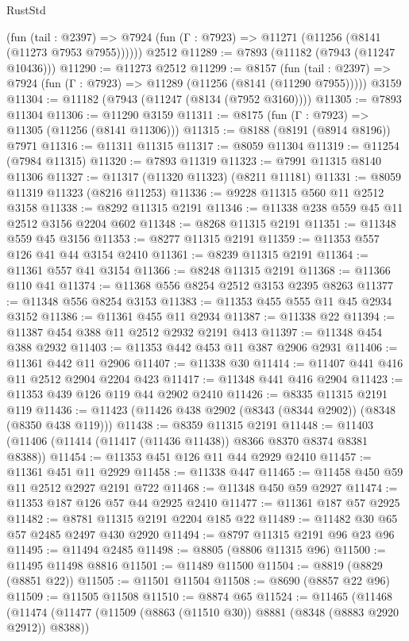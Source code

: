 \begin{lexlean}{RustStd}
\begin{coremodule}
{\begin{coremodule}
{{{{{{{{{{{{{{{{{{{{{{{{{{{{{{{{{{{{{{{{{{{{{{{{{{      (fun (tail : @2397) =>
      @7924 (fun (Γ : @7923) => @11271 (@11256 (@8141 (@11273 @7953 @7955))))))
    @2512
@11289 := @7893 (@11182 (@7943 (@11247 @10436)))
@11290 := @11273 @2512
@11299 := @8157
    (fun (tail : @2397) => @7924 (fun (Γ : @7923) => @11289 (@11256 (@8141 (@11290 @7955)))))
    @3159
@11304 := @11182 (@7943 (@11247 (@8134 (@7952 @3160))))
@11305 := @7893 @11304
@11306 := @11290 @3159
@11311 := @8175 (fun (Γ : @7923) => @11305 (@11256 (@8141 @11306)))
@11315 := @8188 (@8191 (@8914 @8196)) @7971
@11316 := @11311 @11315
@11317 := @8059 @11304
@11319 := @11254 (@7984 @11315)
@11320 := @7893 @11319
@11323 := @7991 @11315 @8140 @11306
@11327 := @11317 (@11320 @11323) (@8211 @11181)
@11331 := @8059 @11319 @11323 (@8216 @11253)
@11336 := @9228 @11315 @560 @11 @2512 @3158
@11338 := @8292 @11315 @2191
@11346 := @11338 @238 @559 @45 @11 @2512 @3156 @2204 @602
@11348 := @8268 @11315 @2191
@11351 := @11348 @559 @45 @3156
@11353 := @8277 @11315 @2191
@11359 := @11353 @557 @126 @41 @44 @3154 @2410
@11361 := @8239 @11315 @2191
@11364 := @11361 @557 @41 @3154
@11366 := @8248 @11315 @2191
@11368 := @11366 @110 @41
@11374 := @11368 @556 @8254 @2512 @3153 @2395 @8263
@11377 := @11348 @556 @8254 @3153
@11383 := @11353 @455 @555 @11 @45 @2934 @3152
@11386 := @11361 @455 @11 @2934
@11387 := @11338 @22
@11394 := @11387 @454 @388 @11 @2512 @2932 @2191 @413
@11397 := @11348 @454 @388 @2932
@11403 := @11353 @442 @453 @11 @387 @2906 @2931
@11406 := @11361 @442 @11 @2906
@11407 := @11338 @30
@11414 := @11407 @441 @416 @11 @2512 @2904 @2204 @423
@11417 := @11348 @441 @416 @2904
@11423 := @11353 @439 @126 @119 @44 @2902 @2410
@11426 := @8335 @11315 @2191 @119
@11436 := @11423 (@11426 @438 @2902 (@8343 (@8344 @2902)) (@8348 (@8350 @438 @119)))
@11438 := @8359 @11315 @2191
@11448 := @11403 (@11406 (@11414 (@11417 (@11436 @11438)) @8366 @8370 @8374 @8381 @8388))
@11454 := @11353 @451 @126 @11 @44 @2929 @2410
@11457 := @11361 @451 @11 @2929
@11458 := @11338 @447
@11465 := @11458 @450 @59 @11 @2512 @2927 @2191 @722
@11468 := @11348 @450 @59 @2927
@11474 := @11353 @187 @126 @57 @44 @2925 @2410
@11477 := @11361 @187 @57 @2925
@11482 := @8781 @11315 @2191 @2204 @185 @22
@11489 := @11482 @30 @65 @57 @2485 @2497 @430 @2920
@11494 := @8797 @11315 @2191 @96 @23 @96
@11495 := @11494 @2485
@11498 := @8805 (@8806 @11315 @96)
@11500 := @11495 @11498 @8816
@11501 := @11489 @11500
@11504 := @8819 (@8829 (@8851 @22))
@11505 := @11501 @11504
@11508 := @8690 (@8857 @22 @96)
@11509 := @11505 @11508
@11510 := @8874 @65
@11524 := @11465
    (@11468
      (@11474
        (@11477 (@11509 (@8863 (@11510 @30)) @8881 (@8348 (@8883 @2920 @2912)) @8388))
}}}}}}}}}}}}}}}}}}}}}}}}}}}}}}}}}}}}}}}}}}}}}}}}}}
\end{coremodule}}
\end{coremodule}
\end{lexlean}
